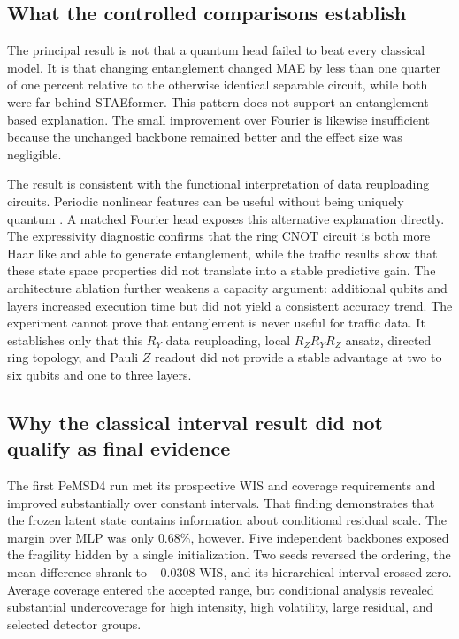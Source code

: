 \documentclass[pdflatex,sn-mathphys-num]{sn-jnl}
\begin{document}
\subsection{What the controlled comparisons establish}\label{subsec:interpretation}

The principal result is not that a quantum head failed to beat every classical model. It is that changing entanglement changed MAE by less than one quarter of one percent relative to the otherwise identical separable circuit, while both were far behind STAEformer. This pattern does not support an entanglement based explanation. The small improvement over Fourier is likewise insufficient because the unchanged backbone remained better and the effect size was negligible.

The result is consistent with the functional interpretation of data reuploading circuits. Periodic nonlinear features can be useful without being uniquely quantum \cite{schuld2021encoding}. A matched Fourier head exposes this alternative explanation directly. The expressivity diagnostic confirms that the ring CNOT circuit is both more Haar like and able to generate entanglement, while the traffic results show that these state space properties did not translate into a stable predictive gain. The architecture ablation further weakens a capacity argument: additional qubits and layers increased execution time but did not yield a consistent accuracy trend. The experiment cannot prove that entanglement is never useful for traffic data. It establishes only that this \(R_Y\) data reuploading, local \(R_ZR_YR_Z\) ansatz, directed ring topology, and Pauli \(Z\) readout did not provide a stable advantage at two to six qubits and one to three layers.

\subsection{Why the classical interval result did not qualify as final evidence}\label{subsec:replicationdiscussion}

The first PeMSD4 run met its prospective WIS and coverage requirements and improved substantially over constant intervals. That finding demonstrates that the frozen latent state contains information about conditional residual scale. The margin over MLP was only \(0.68\%\), however. Five independent backbones exposed the fragility hidden by a single initialization. Two seeds reversed the ordering, the mean difference shrank to $-0.0308$ WIS, and its hierarchical interval crossed zero. Average coverage entered the accepted range, but conditional analysis revealed substantial undercoverage for high intensity, high volatility, large residual, and selected detector groups.
\end{document}
